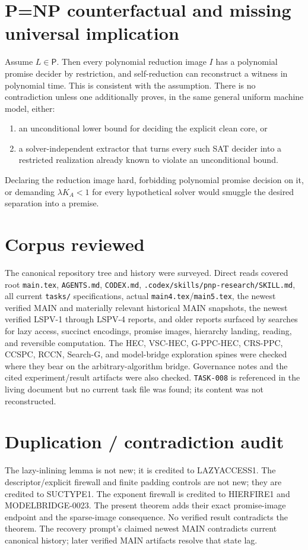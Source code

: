 \documentclass[11pt]{article}
\begin{document}
\section*{P=NP counterfactual and missing universal implication}
Assume $L\in\mathsf P$.  Then every polynomial reduction image $I$ has a
polynomial promise decider by restriction, and self-reduction can reconstruct a
witness in polynomial time.  This is consistent with the assumption.  There is
no contradiction unless one additionally proves, in the same general uniform
machine model, either:
\begin{enumerate}
\item an unconditional lower bound for deciding the explicit clean core, or
\item a solver-independent extractor that turns every such SAT decider into a
restricted realization already known to violate an unconditional bound.
\end{enumerate}
Declaring the reduction image hard, forbidding polynomial promise decision on
it, or demanding $\lambda K_A<1$ for every hypothetical solver would smuggle
the desired separation into a premise.

\section*{Corpus reviewed}
The canonical repository tree and history were surveyed.  Direct reads covered
root \texttt{main.tex}, \texttt{AGENTS.md}, \texttt{CODEX.md},
\texttt{.codex/skills/pnp-research/SKILL.md}, all current \texttt{tasks/}
specifications, actual \texttt{main4.tex}/\texttt{main5.tex}, the newest
verified MAIN and materially relevant historical MAIN snapshots, the newest
verified LSPV-1 through LSPV-4 reports, and older reports surfaced by searches
for lazy access, succinct encodings, promise images, hierarchy landing,
reading, and reversible computation.  The HEC, VSC-HEC, G-PPC-HEC, CRS-PPC,
CCSPC, RCCN, Search-G, and model-bridge exploration spines were checked where
they bear on the arbitrary-algorithm bridge.  Governance notes and the cited
experiment/result artifacts were also checked.  \texttt{TASK-008} is
referenced in the living document but no current task file was found; its
content was not reconstructed.

\section*{Duplication / contradiction audit}
The lazy-inlining lemma is not new; it is credited to LAZYACCESS1.  The
descriptor/explicit firewall and finite padding controls are not new; they are
credited to SUCTYPE1.  The exponent firewall is credited to HIERFIRE1 and
MODELBRIDGE-0023.  The present theorem adds their exact promise-image endpoint
and the sparse-image consequence.  No verified result contradicts the theorem.
The recovery prompt's claimed newest MAIN contradicts current canonical
history; later verified MAIN artifacts resolve that state lag.
\end{document}
